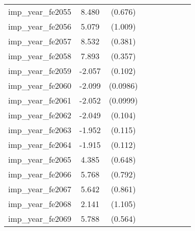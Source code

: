 {\begin{tabular}{l*{4}{cc}}
imp\_year\_fe2055&    8.480\sym{***}&  (0.676)&                  &         &                  &         &                  &         \\
imp\_year\_fe2056&    5.079\sym{***}&  (1.009)&                  &         &                  &         &                  &         \\
imp\_year\_fe2057&    8.532\sym{***}&  (0.381)&                  &         &                  &         &                  &         \\
imp\_year\_fe2058&    7.893\sym{***}&  (0.357)&                  &         &                  &         &                  &         \\
imp\_year\_fe2059&   -2.057\sym{***}&  (0.102)&                  &         &                  &         &                  &         \\
imp\_year\_fe2060&   -2.099\sym{***}& (0.0986)&                  &         &                  &         &                  &         \\
imp\_year\_fe2061&   -2.052\sym{***}& (0.0999)&                  &         &                  &         &                  &         \\
imp\_year\_fe2062&   -2.049\sym{***}&  (0.104)&                  &         &                  &         &                  &         \\
imp\_year\_fe2063&   -1.952\sym{***}&  (0.115)&                  &         &                  &         &                  &         \\
imp\_year\_fe2064&   -1.915\sym{***}&  (0.112)&                  &         &                  &         &                  &         \\
imp\_year\_fe2065&    4.385\sym{***}&  (0.648)&                  &         &                  &         &                  &         \\
imp\_year\_fe2066&    5.768\sym{***}&  (0.792)&                  &         &                  &         &                  &         \\
imp\_year\_fe2067&    5.642\sym{***}&  (0.861)&                  &         &                  &         &                  &         \\
imp\_year\_fe2068&    2.141         &  (1.105)&                  &         &                  &         &                  &         \\
imp\_year\_fe2069&    5.788\sym{***}&  (0.564)&                  &         &                  &         &                  &         \\

\end{tabular}}
